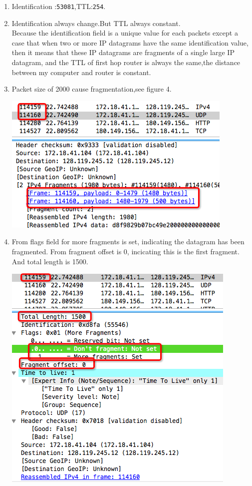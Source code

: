 \documentclass[a4paper]{article}
\begin{document}
{\begin{enumerate}
	\item Identification :\verb|53081|,TTL:\verb|254|.
	\item Identification always change.But TTL always constant.\\Because the identification field is a unique value for each packets except a case that when two or more IP datagrams have the same identification value, then it means that these IP datagrams are fragments of a single large IP datagram,
	  and the TTL of first hop router is always the same,the distance between my computer and router is constant.
	\item Packet size of 2000 cause fragmentation,see figure 4. 
	\begin{center} \includegraphics[scale=0.5]{Illustrations/4.png} \end{center}
	\item From flags field for more fragments is set, indicating the datagram has been fragmented. From fragment offset is 0, incicating this is the first fragment.
	  And total length is 1500.
	\begin{center} \includegraphics[scale=0.5]{Illustrations/5.png} \end{center}

\end{enumerate}}
\end{document}
